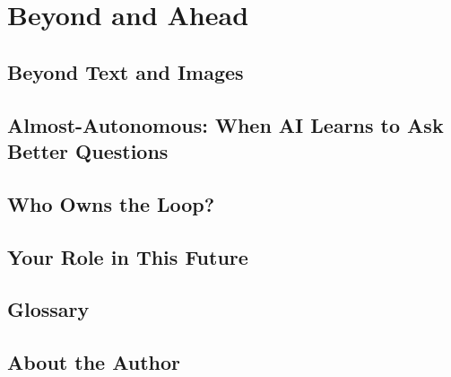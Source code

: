\documentclass[
11pt,                    %
twoside,                 %
openright,               %
headinclude,             %
footinclude=false,       %
BCOR=12mm,               %
DIV=12,                  %
numbers=noenddot,        %
bibliography=totoc,      %
listof=totoc,            %
]{scrbook}
\begin{document}
	\part{Beyond and Ahead}

	\chapter{Beyond Text and Images}
	\label{ch:beyond}
	
	

	\chapter{Almost-Autonomous: When AI Learns to Ask Better Questions}
	\label{ch:autonomous}
	
	

	\chapter{Who Owns the Loop?}
	\label{ch:ownership}
	
	

	\chapter{Your Role in This Future}
	\label{ch:future}
	
	
	
	\backmatter
	
	\printbibliography[heading=bibintoc]
	
	\chapter{Glossary}
	
	
	\printindex
	
	\chapter{About the Author}
	
	
\end{document}
